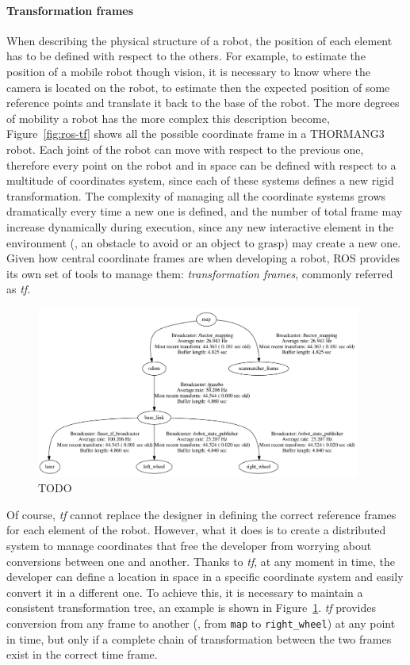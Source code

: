 \paragraph{Transformation frames} When describing the physical structure of a robot, the position of each element has to be defined with respect to the others. For example, to estimate the position of a mobile robot though vision, it is necessary to know where the camera is located on the robot, to estimate then the expected position of some reference points and translate it back to the base of the robot. The more degrees of mobility a robot has the more complex this description become, Figure~\ref{fig:ros-tf} shows all the possible coordinate frame in a THORMANG3 robot. Each joint of the robot can move with respect to the previous one, therefore every point on the robot and in space can be defined with respect to a multitude of coordinates system, since each of these systems defines a new rigid transformation. The complexity of managing all the coordinate systems grows dramatically every time a new one is defined, and the number of total frame may increase dynamically during execution, since any new interactive element in the environment (\eg, an obstacle to avoid or an object to grasp)  may create a new one. Given how central coordinate frames are when developing a robot, ROS provides its own set of tools to manage them: \textit{transformation frames}, commonly referred as \textit{tf}.

\begin{figure}[t]
    \centering
    \includegraphics[width=0.95\textwidth]{gfx/ros/tf_tree}
    \caption{TODO}\label{fig:ros-tf-tree}
\end{figure}

Of course, \textit{tf} cannot replace the designer in defining the correct reference frames for each element of the robot. However, what it does is to create a distributed system to manage coordinates that free the developer from worrying about conversions between one and another. Thanks to \textit{tf}, at any moment in time, the developer can define a location in space in a specific coordinate system and easily convert it in a different one. To achieve this, it is necessary to maintain a consistent transformation tree, an example is shown in Figure~\ref{fig:ros-tf-tree}. \textit{tf} provides conversion from any frame to another (\eg, from \texttt{map} to \texttt{right\_wheel}) at any point in time, but only if a complete chain of transformation between the two frames exist in the correct time frame.

